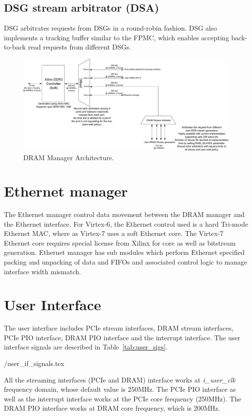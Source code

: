\subsection{DSG stream arbitrator (DSA)}
DSG arbitrates requests from DSGs in a round-robin fashion.
DSG also implements a tracking buffer similar to the FPMC, which enables accepting back-to-back read requests from different DSGs.
\begin{figure}[t]
\centering
\includegraphics[width=16cm]{figures/ddr_arbitration.pdf}
\caption{DRAM Manager Architecture.}
\label{exe_model}
\end{figure}

\section{Ethernet manager}
The Ethernet manager control data movement between the DRAM manager and the Ethernet interface.
For Virtex-6, the Ethernet control used is a hard Tri-mode Ethernet MAC, where as Virtex-7 uses a soft Ethernet core.
The Virtex-7 Ethernet core requires special license from Xilinx for core as well as bitstream generation.
Ethernet manager has sub modules which perform Ethernet specified packing and unpacking of data and FIFOs and associated control logic to manage interface width mismatch.


\section{User Interface}
The user interface includes PCIe stream interfaces, DRAM stream interfaces, PCIe PIO interface, DRAM PIO interface and the interrupt interface.
The user interface signals are described in Table~\ref{tab:user_sigs}.

 \TBLDIR/user_if_signals.tex

All the streaming interfaces (PCIe and DRAM) interface works at \emph{i\_user\_clk} frequency domain, whose default value is 250MHz.
The PCIe PIO interface as well as the interrupt interface works at the PCIe core frequency (250MHz).
The DRAM PIO interface works at DRAM core frequency, which is 200MHz.







